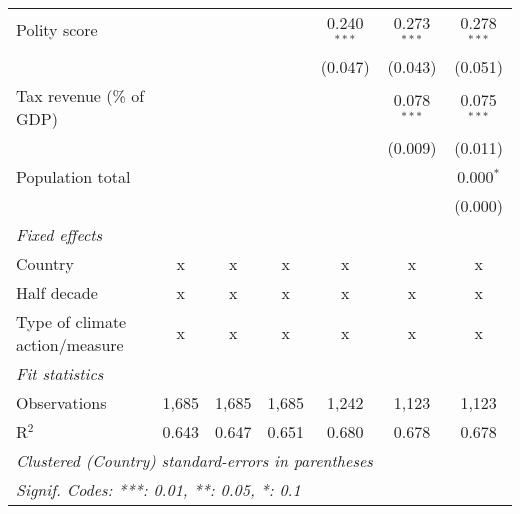 \begin{tabular}{lcccccc}
   Polity score                                                            &         &                &                & 0.240$^{***}$  & 0.273$^{***}$  & 0.278$^{***}$\\   
                                                                           &         &                &                & (0.047)        & (0.043)        & (0.051)\\   
   Tax revenue (\% of GDP)                                                 &         &                &                &                & 0.078$^{***}$  & 0.075$^{***}$\\   
                                                                           &         &                &                &                & (0.009)        & (0.011)\\   
   Population total                                                        &         &                &                &                &                & 0.000$^{*}$\\   
                                                                           &         &                &                &                &                & (0.000)\\   
   \emph{Fixed effects}\\
   Country                                                                 & x       & x              & x              & x              & x              & x\\  
   Half decade                                                             & x       & x              & x              & x              & x              & x\\  
   Type of climate action/measure                                          & x       & x              & x              & x              & x              & x\\  
   \midrule \emph{Fit statistics}\\
   Observations                                                            & 1,685   & 1,685          & 1,685          & 1,242          & 1,123          & 1,123\\  
   R$^2$                                                                   & 0.643   & 0.647          & 0.651          & 0.680          & 0.678          & 0.678\\  
   \midrule
   \multicolumn{7}{l}{\emph{Clustered (Country) standard-errors in parentheses}}\\
   \multicolumn{7}{l}{\emph{Signif. Codes: ***: 0.01, **: 0.05, *: 0.1}}\\
\end{tabular}
\par\endgroup


